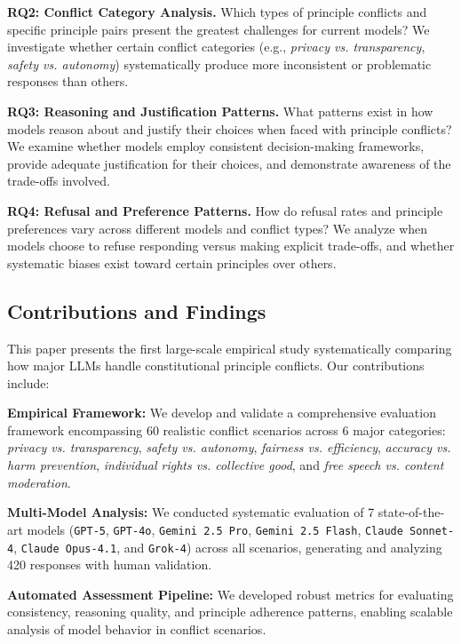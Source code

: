 \documentclass[11pt,a4paper]{article}
\newcommand{\model}[1]{\texttt{#1}}
\newcommand{\principle}[1]{\textit{#1}}
\begin{document}
\textbf{RQ2: Conflict Category Analysis.} Which types of principle conflicts and specific principle pairs present the greatest challenges for current models? We investigate whether certain conflict categories (e.g., \principle{privacy vs. transparency}, \principle{safety vs. autonomy}) systematically produce more inconsistent or problematic responses than others.

\textbf{RQ3: Reasoning and Justification Patterns.} What patterns exist in how models reason about and justify their choices when faced with principle conflicts? We examine whether models employ consistent decision-making frameworks, provide adequate justification for their choices, and demonstrate awareness of the trade-offs involved.

\textbf{RQ4: Refusal and Preference Patterns.} How do refusal rates and principle preferences vary across different models and conflict types? We analyze when models choose to refuse responding versus making explicit trade-offs, and whether systematic biases exist toward certain principles over others.

\subsection{Contributions and Findings}

This paper presents the first large-scale empirical study systematically comparing how major LLMs handle constitutional principle conflicts. Our contributions include:

\textbf{Empirical Framework:} We develop and validate a comprehensive evaluation framework encompassing 60 realistic conflict scenarios across 6 major categories: \principle{privacy vs. transparency}, \principle{safety vs. autonomy}, \principle{fairness vs. efficiency}, \principle{accuracy vs. harm prevention}, \principle{individual rights vs. collective good}, and \principle{free speech vs. content moderation}.

\textbf{Multi-Model Analysis:} We conducted systematic evaluation of 7 state-of-the-art models (\model{GPT-5}, \model{GPT-4o}, \model{Gemini 2.5 Pro}, \model{Gemini 2.5 Flash}, \model{Claude Sonnet-4}, \model{Claude Opus-4.1}, and \model{Grok-4}) across all scenarios, generating and analyzing 420 responses with human validation.

\textbf{Automated Assessment Pipeline:} We developed robust metrics for evaluating consistency, reasoning quality, and principle adherence patterns, enabling scalable analysis of model behavior in conflict scenarios.
\end{document}

